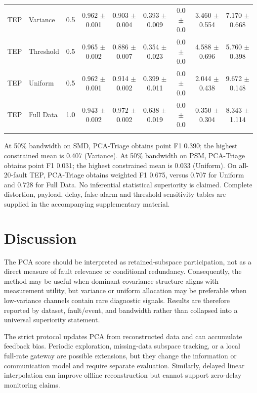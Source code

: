 \documentclass[pdflatex,sn-vancouver-num]{sn-jnl}
\theoremstyle{thmstyleone}
\begin{document}
\begin{table}
{\begin{tabular}{@{}llccccccc@{}}
TEP & Variance & 0.5 & 0.962 $\pm$ 0.001 & 0.903 $\pm$ 0.004 & 0.393 $\pm$ 0.009 & 0.0 $\pm$ 0.0 & 3.460 $\pm$ 0.554 & 7.170 $\pm$ 0.668 \\
TEP & Threshold & 0.5 & 0.965 $\pm$ 0.002 & 0.886 $\pm$ 0.007 & 0.354 $\pm$ 0.023 & 0.0 $\pm$ 0.0 & 4.588 $\pm$ 0.696 & 5.760 $\pm$ 0.398 \\
TEP & Uniform & 0.5 & 0.962 $\pm$ 0.001 & 0.914 $\pm$ 0.002 & 0.399 $\pm$ 0.011 & 0.0 $\pm$ 0.0 & 2.044 $\pm$ 0.438 & 9.672 $\pm$ 0.148 \\
TEP & Full Data & 1.0 & 0.943 $\pm$ 0.002 & 0.972 $\pm$ 0.002 & 0.638 $\pm$ 0.019 & 0.0 $\pm$ 0.0 & 0.350 $\pm$ 0.304 & 8.343 $\pm$ 1.114 \\
\addlinespace
\bottomrule
\end{tabular}%
}
\label{tab:detection}
\end{table}

At 50\% bandwidth on SMD, PCA-Triage obtains point F1 0.390; the highest constrained mean is 0.407 (Variance).
At 50\% bandwidth on PSM, PCA-Triage obtains point F1 0.031; the highest constrained mean is 0.033 (Uniform).
On all-20-fault TEP, PCA-Triage obtains weighted F1 0.675, versus 0.707 for Uniform and 0.728 for Full Data.
No inferential statistical superiority is claimed. Complete distortion, payload, delay, false-alarm and threshold-sensitivity tables are supplied in the accompanying supplementary material.


\section{Discussion}

The PCA score should be interpreted as retained-subspace participation, not as
a direct measure of fault relevance or conditional redundancy. Consequently,
the method may be useful when dominant covariance structure aligns with
measurement utility, but variance or uniform allocation may be preferable when
low-variance channels contain rare diagnostic signals. Results are therefore
reported by dataset, fault/event, and bandwidth rather than collapsed into a
universal superiority statement.

The strict protocol updates PCA from reconstructed data and can accumulate
feedback bias. Periodic exploration, missing-data subspace tracking, or a local
full-rate gateway are possible extensions, but they change the information or
communication model and require separate evaluation. Similarly, delayed
linear interpolation can improve offline reconstruction but cannot support
zero-delay monitoring claims.
\end{document}
